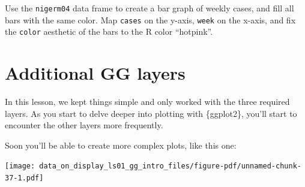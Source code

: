 \documentclass[
  letterpaper,
  DIV=11,
  numbers=noendperiod]{scrreprt}
\begin{document}
\begin{tcolorbox}[enhanced jigsaw, colframe=quarto-callout-tip-color-frame, colbacktitle=quarto-callout-tip-color!10!white, titlerule=0mm, opacitybacktitle=0.6, breakable, toprule=.15mm, arc=.35mm, rightrule=.15mm, colback=white, bottomrule=.15mm, opacityback=0, toptitle=1mm, left=2mm, bottomtitle=1mm, title=\textcolor{quarto-callout-tip-color}{\faLightbulb}\hspace{0.5em}{Practice}, leftrule=.75mm, coltitle=black]

Use the \texttt{nigerm04} data frame to create a bar graph of weekly
cases, and fill all bars with the same color. Map \texttt{cases} on the
y-axis, \texttt{week} on the x-axis, and fix the \texttt{color}
aesthetic of the bars to the R color ``hotpink''.

\end{tcolorbox}

\hypertarget{additional-gg-layers}{%
\section{Additional GG layers}\label{additional-gg-layers}}

In this lesson, we kept things simple and only worked with the three
required layers. As you start to delve deeper into plotting with
\{ggplot2\}, you'll start to encounter the other layers more frequently.

Soon you'll be able to create more complex plots, like this one:

\texttt{[image: data\_on\_display\_ls01\_gg\_intro\_files/figure-pdf/unnamed-chunk-37-1.pdf]}
\end{document}
